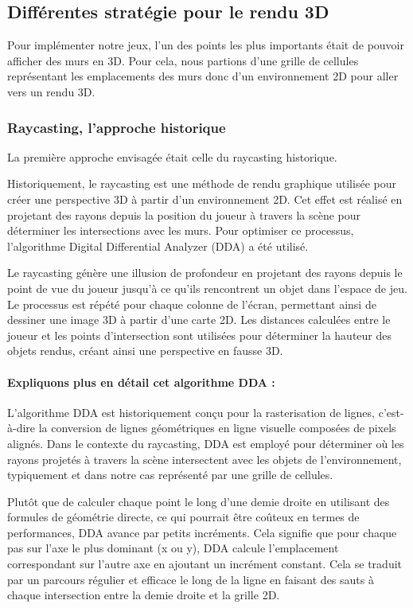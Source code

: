 \documentclass[11pt]{article}
\begin{document}
\subsection{Différentes stratégie pour le rendu 3D}
Pour implémenter notre jeux, l'un des points les plus importants était de pouvoir afficher des murs en 3D. Pour cela, nous partions d'une grille de cellules 
représentant les emplacements des murs donc d'un environnement 2D pour aller vers un rendu 3D.
\subsubsection{Raycasting, l'approche historique}
La première approche envisagée était celle du raycasting historique.

Historiquement, le raycasting est une méthode de rendu graphique utilisée pour créer une perspective 3D à partir d'un environnement 2D. Cet effet est réalisé en projetant des 
rayons depuis la position du joueur à travers la scène pour déterminer les intersections avec les murs. Pour optimiser ce
processus, l'algorithme Digital Differential Analyzer (DDA) a été utilisé.

Le raycasting génère une illusion de profondeur en projetant des rayons depuis le point de vue du joueur jusqu'à ce qu'ils rencontrent un 
objet dans l'espace de jeu. Le processus est répété pour chaque colonne de l'écran, permettant ainsi de dessiner une image 3D à partir d'une
carte 2D. Les distances calculées entre le joueur et les points d'intersection sont utilisées pour déterminer la hauteur des objets rendus, 
créant ainsi une perspective en fausse 3D.

\paragraph{Expliquons plus en détail cet algorithme DDA :}
L'algorithme DDA est historiquement conçu pour la rasterisation de lignes, c'est-à-dire la conversion de lignes géométriques en ligne visuelle composées de pixels 
alignés. Dans le contexte du raycasting, DDA est employé pour déterminer où les rayons projetés à travers la scène intersectent avec les objets de l'environnement, 
typiquement et dans notre cas représenté par une grille de cellules.

Plutôt que de calculer chaque point le long d'une demie droite en utilisant des formules de géométrie 
directe, ce qui pourrait être coûteux en termes de performances, DDA avance par petits incréments. Cela signifie que pour chaque pas sur l'axe le plus 
dominant (x ou y), DDA calcule l'emplacement correspondant sur l'autre axe en ajoutant un incrément constant. Cela se traduit par un parcours régulier et 
efficace le long de la ligne en faisant des sauts à chaque intersection entre la demie droite et la grille 2D.
\end{document}

